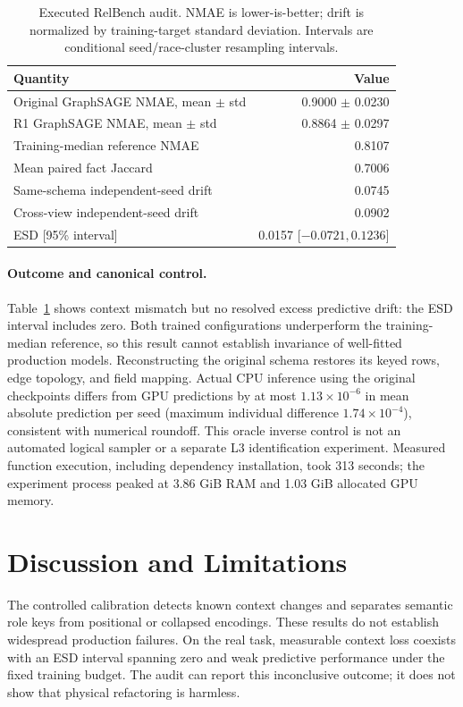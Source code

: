 \documentclass[runningheads]{llncs}
\begin{document}
\begin{table}[t]
\centering
\caption{Executed RelBench audit. NMAE is lower-is-better; drift is normalized by training-target standard deviation. Intervals are conditional seed/race-cluster resampling intervals.}
\label{tab:real}
\small
\begin{tabular}{lr}
\toprule
Quantity & Value\\
\midrule
Original GraphSAGE NMAE, mean $\pm$ std & 0.9000 $\pm$ 0.0230\\
R1 GraphSAGE NMAE, mean $\pm$ std & 0.8864 $\pm$ 0.0297\\
Training-median reference NMAE & 0.8107\\
Mean paired fact Jaccard & 0.7006\\
Same-schema independent-seed drift & 0.0745\\
Cross-view independent-seed drift & 0.0902\\
ESD [95\% interval] & 0.0157 [$ -0.0721,0.1236$]\\
\bottomrule
\end{tabular}
\end{table}

\paragraph{Outcome and canonical control.}
Table~\ref{tab:real} shows context mismatch but no resolved excess predictive drift: the ESD interval includes zero. Both trained configurations underperform the training-median reference, so this result cannot establish invariance of well-fitted production models. Reconstructing the original schema restores its keyed rows, edge topology, and field mapping. Actual CPU inference using the original checkpoints differs from GPU predictions by at most $1.13\!\times\!10^{-6}$ in mean absolute prediction per seed (maximum individual difference $1.74\!\times\!10^{-4}$), consistent with numerical roundoff. This oracle inverse control is not an automated logical sampler or a separate L3 identification experiment. Measured function execution, including dependency installation, took 313 seconds; the experiment process peaked at 3.86 GiB RAM and 1.03 GiB allocated GPU memory.

\section{Discussion and Limitations}
The controlled calibration detects known context changes and separates semantic role keys from positional or collapsed encodings. These results do not establish widespread production failures. On the real task, measurable context loss coexists with an ESD interval spanning zero and weak predictive performance under the fixed training budget. The audit can report this inconclusive outcome; it does not show that physical refactoring is harmless.
\end{document}
